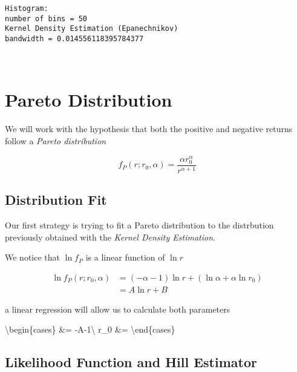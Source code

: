 \documentclass[11pt]{article}
\begin{document}
    \begin{Verbatim}[commandchars=\\\{\}]
Histogram:
number of bins = 50
Kernel Density Estimation (Epanechnikov)
bandwidth = 0.014556118395784377

    \end{Verbatim}

    \begin{center}
    \end{center}
    { \hspace*{\fill} \\}
    
    \hypertarget{pareto-distribution}{%
\section{Pareto Distribution}\label{pareto-distribution}}

We will work with the hypothesis that both the positive and negative
returns follow a \emph{Pareto distribution}

\[f_P(r;r_0, \alpha) = \frac{\alpha r_0^{\alpha}}{r^{\alpha+1}}\]

\hypertarget{distribution-fit}{%
\subsection{Distribution Fit}\label{distribution-fit}}

Our first strategy is trying to fit a Pareto distribution to the
distrbution previously obtained with the \emph{Kernel Density
Estimation}.

We notice that \(\ln{f_P}\) is a linear function of \(\ln{r}\)

\begin{align}
\ln{f_P(r;r_0, \alpha)} &= (-\alpha-1)\ln{r} + (\ln{\alpha} + \alpha\ln{r_0})   \\
                          &= A\ln{r} + B
\end{align}

a linear regression will allow us to calculate both parameters

\textbackslash{}begin\{cases\} \alpha \&= -A-1\textbackslash{} r\_0 \&=
 \textbackslash{}end\{cases\}

\hypertarget{likelihood-function-and-hill-estimator}{%
\subsection{Likelihood Function and Hill
Estimator}\label{likelihood-function-and-hill-estimator}}
\end{document}
